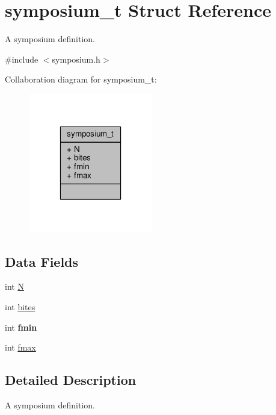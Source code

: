 \hypertarget{structsymposium__t}{\section{symposium\-\_\-t Struct Reference}
\label{structsymposium__t}
}


A symposium definition.  




{\ttfamily \#include $<$symposium.\-h$>$}



Collaboration diagram for symposium\-\_\-t\-:
\nopagebreak
\begin{figure}[H]
\begin{center}
\leavevmode
\includegraphics[width=154pt]{structsymposium__t__coll__graph}
\end{center}
\end{figure}
\subsection*{Data Fields}
\begin{DoxyCompactItemize}
\item 
int \hyperlink{structsymposium__t_a4e366c10036b2d89ebc2dbcdefba8999}{N}
\item 
int \hyperlink{structsymposium__t_a9ee1b978200b8a4b7c30b170c1f20643}{bites}
\item 
\hypertarget{structsymposium__t_ab7af5af3a92d6c03bf916571a09d6aed}{int {\bfseries fmin}}\label{structsymposium__t_ab7af5af3a92d6c03bf916571a09d6aed}

\item 
int \hyperlink{structsymposium__t_a038b49a350225fed31d5c148a9147ec6}{fmax}
\end{DoxyCompactItemize}


\subsection{Detailed Description}
A symposium definition. 

